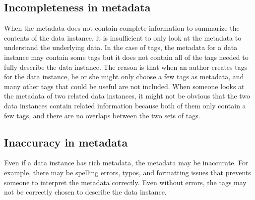 \subsection{Incompleteness in metadata}
When the metadata does not contain complete information to summarize the contents of the data instance, it is insufficient to only look at the metadata to understand the underlying data. In the case of tags, the metadata for a data instance may contain some tags but it does not contain all of the tags needed to fully describe the data instance. The reason is that when an author creates tags for the data instance, he or she might only choose a few tags as metadata, and many other tags that could be useful are not included. When someone looks at the metadata of two related data instances, it might not be obvious that the two data instances contain related information because both of them only contain a few tags, and there are no overlaps between the two sets of tags.

\subsection{Inaccuracy in metadata}
Even if a data instance has rich metadata, the metadata may be inaccurate. For example, there may be spelling errors, typos, and formatting issues that prevents someone to interpret the metadata correctly. Even without errors, the tags may not be correctly chosen to describe the data instance.

